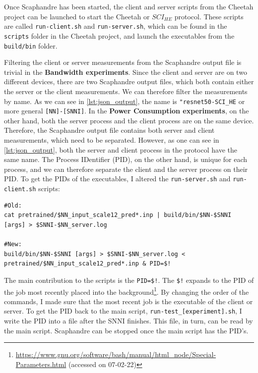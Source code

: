 \documentclass[../thesis.tex]{subfiles}
\begin{document}
Once Scaphandre has been started, the client and server scripts from the Cheetah project can be launched to start the Cheetah or $SCI_{HE}$ protocol. These scripts are called \verb|run-client.sh| and \verb|run-server.sh|, which can be found in the \verb|scripts| folder in the Cheetah project, and launch the executables from the \verb|build/bin| folder. 

Filtering the client or server measurements from the Scaphandre output file is trivial in the \textbf{Bandwidth experiments}. Since the client and server are on two different devices, there are two Scaphandre output files, which both contain either the server or the client measurements. We can therefore filter the measurements by name. As we can see in \ref{lst:json_output}, the name is \verb|"resnet50-SCI_HE| or more general \verb|[NN]-[SNNI]|. In the \textbf{Power Consumption experiments}, on the other hand, both the server process and the client process are on the same device. Therefore, the Scaphandre output file contains both server and client measurements, which need to be separated. However, as one can see in \ref{lst:json_output}, both the server and client process in the protocol have the same name. The Process IDentifier (PID), on the other hand, is unique for each process, and we can therefore separate the client and the server process on their PID. To get the PIDs of the executables, I altered the \verb|run-server.sh| and \verb|run-client.sh| scripts:

\begin{lstlisting}[language=Cplusplus, alsoletter={[]}]
#Old:
cat pretrained/$NN_input_scale12_pred*.inp | build/bin/$NN-$SNNI [args] > $SNNI-$NN_server.log
    
#New:
build/bin/$NN-$SNNI [args] > $SNNI-$NN_server.log < pretrained/$NN_input_scale12_pred*.inp & PID=$!
\end{lstlisting}

The main contribution to the scripts is the \verb|PID=$!|. The \verb|$!| expands to the PID of the job most recently placed into the background\footnote{\url{https://www.gnu.org/software/bash/manual/html_node/Special-Parameters.html} (accessed on 07-02-22)}. By changing the order of the commands, I made sure that the most recent job is the executable of the client or server. To get the PID back to the main script, \verb|run-test_[experiment].sh|, I write the PID into a file after the SNNI finishes. This file, in turn, can be read by the main script. Scaphandre can be stopped once the main script has the PID's.
\end{document}
